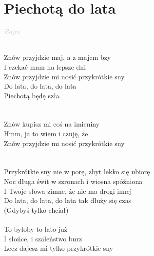 \documentclass[a5paper, 10pt]{book}
\begin{document}
\newpage
\section{Piechotą do lata}\textcolor{lightgray}{\textit{Bajm}}\\~\\
\begin{minipage}[t]{0.7\textwidth}
Znów przyjdzie maj, a z majem bzy\\
I czekać mam na lepsze dni\\
Znów przyjdzie mi nosić przykrótkie sny\\

\hspace*{6mm}Do lata, do lata, do lata\\
\hspace*{6mm}Piechotą będę szła\\
\\
\\
Znów kupisz mi coś na imieniny\\
Hmm, ja to wiem i czuję, że\\
Znów przyjdzie mi nosić przykrótkie sny\\
\\
\\
\hspace*{2mm}Przykrótkie sny nie w porę, zbyt lekko się ubiorę\\
\hspace*{2mm}Noc długa świt w szronach i wiosna spóźniona\\
\hspace*{2mm}I Twoje słowa zimne, że nie ma drogi innej\\
\hspace*{2mm}Do lata, do lata, do lata tak dłuży się czas\\
\hspace*{2mm}(Gdybyś tylko chciał)\\
\\
To byłoby to lato już\\
I słońce, i szaleństwo burz\\
Lecz dajesz mi tylko przykrótkie sny\\
\end{minipage}
\end{document}
